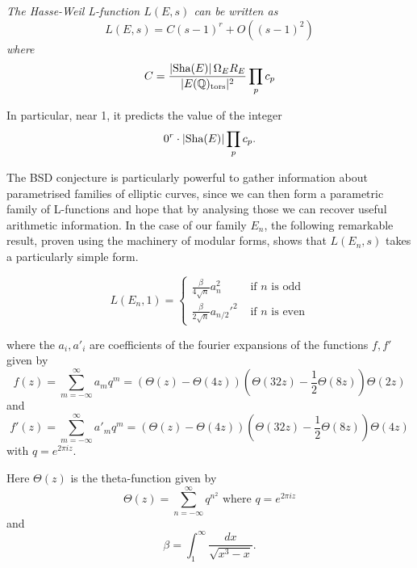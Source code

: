 \documentclass[12pt, a4paper]{amsart}
\begin{document}
\begin{conj} \normalfont
  \textit{The Hasse-Weil L-function $L(E,s)$ can be written as
  \[L(E,s) = C (s-1)^r + O((s-1)^2)\] where}
\begin{equation} \label{eq:bsd}
  C = \frac{|\text{Sha}(E)| \, \Omega_E R_E}{|E({\mathbb Q})_{\text{tors}}|^2} \prod_p c_p
\end{equation}
\end{conj}

In particular, near 1, it predicts the value of the integer
\[0^r \cdot | \text{\normalfont Sha}(E)| \prod_p c_p .\]

The BSD conjecture is particularly powerful to gather information about
parametrised families of elliptic curves, since we can then form a parametric
family of L-functions and hope that by analysing those we can recover useful
arithmetic information.
In the case of our family $E_n$, the following remarkable result, proven using
the machinery of modular forms, shows that
$L(E_n,s)$ takes a particularly simple form.

\begin{thm}
  \begin{equation} \label{eq:tunnell}
    L(E_n,1) = \begin{cases}
      \frac{\beta}{4\sqrt{n}}a_n^2 & \text{ if $n$ is odd} \\
      \frac{\beta}{2\sqrt{n}}a_{n/2}'^2 & \text{ if $n$ is even}
    \end{cases}
  \end{equation}

  where the $a_i, a'_i$ are coefficients of the fourier expansions of the
  functions $f, f'$ given by
  \begin{equation} \label{eq:mododd}
    f(z) = \sum\limits_{m=-\infty}^\infty a_m q^m
    = (\Theta(z) - \Theta(4z)) \left(\Theta(32z)-\frac{1}{2} \Theta(8z)\right) \Theta(2z)
  \end{equation}
  and
  \begin{equation} \label{eq:modeven}
    f'(z) = \sum\limits_{m=-\infty}^\infty a'_m q^m =
    (\Theta(z) - \Theta(4z)) \left(\Theta(32z)-\frac{1}{2} \Theta(8z)\right) \Theta(4z)
  \end{equation}
  with $q = e^{2\pi i z}$.
  
  Here $\Theta(z)$ is the theta-function given by
  \[ \Theta(z) = \sum\limits_{n = -\infty}^{\infty} q^{n^2} \text{ where } q =
    e^{2\pi iz}\]
  and
  \[\beta = \int_1^\infty \frac{dx}{\sqrt{x^3-x}}.\]
\end{thm}
\end{document}

